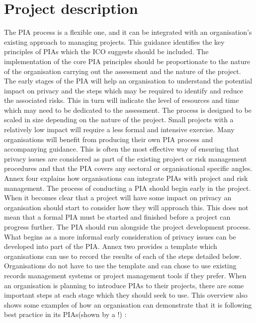 \documentclass{article}
\begin{document}
\section{Project description}
The PIA process is a flexible one, and it can be integrated with an organisation’s existing approach to managing projects. This guidance identifies the key principles of PIAs which the ICO suggests should be included. The implementation of the core PIA principles should be proportionate to the nature of the organisation carrying out the assessment and the nature of the project. The early stages of the PIA will help an organisation to understand the potential impact on privacy and the steps which may be required to identify and reduce the associated risks. This in turn will indicate the level of resources and time which may need to be dedicated to the assessment. The process is designed to be scaled in size depending on the nature of the project. Small projects with a relatively low impact will require a less formal and intensive exercise. Many organisations will benefit from producing their own PIA process and accompanying guidance. This is often the most effective way of ensuring that privacy issues are considered as part of the existing project or risk management procedures and that the PIA covers any sectoral or organisational specific angles. Annex four explains how organisations can integrate PIAs with project and risk management. The process of conducting a PIA should begin early in the project. When it becomes clear that a project will have some impact on privacy an organisation should start to consider how they will approach this. This does not mean that a formal PIA must be started and finished before a project can progress further. The PIA should run alongside the project development process. What begins as a more informal early consideration of privacy issues can be developed into part of the PIA. Annex two provides a template which organisations can use to record the results of each of the steps detailed below. Organisations do not have to use the template and can chose to use existing records management systems or project management tools if they prefer.
When an organisation is planning to introduce PIAs to their projects, there are some important steps at each stage which they should seek to use. This overview also shows some examples of how an organisation can demonstrate that it is following best practice in its PIAs(shown by a !) :
\end{document}
